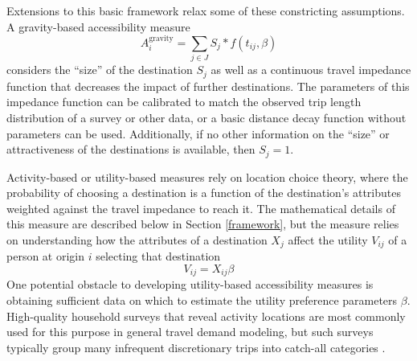 \documentclass[3p, authoryear, review]{elsarticle} %
\begin{document}
Extensions to this basic framework relax some of these constricting assumptions.
A gravity-based accessibility measure
\begin{equation}
  A_i^{\mathrm{gravity}} = \sum_{j \in J} S_j * f(t_{ij}, \beta)
  \label{eq:gravity}
\end{equation}
considers the ``size'' of the destination \(S_j\) as well as a continuous travel
impedance function that decreases the impact of further destinations. The parameters
of this impedance function can be calibrated to match the observed trip length
distribution of a survey or other data, or a basic distance decay function without
parameters can be used. Additionally, if no other information on the ``size'' or
attractiveness of the destinations is available, then \(S_j = 1\).

Activity-based or utility-based measures rely on location choice theory, where
the probability of choosing a destination is a function of the destination's
attributes weighted against the travel impedance to reach it. The mathematical
details of this measure are described below in Section \ref{framework}, but the
measure relies on understanding how the attributes of a destination \(X_j\) affect
the utility \(V_{ij}\) of a person at origin \(i\) selecting that destination
\begin{equation}
V_{ij} = X_{ij}\beta
  \label{eq:simple-utility}
\end{equation}
One potential obstacle to developing utility-based accessibility measures is
obtaining sufficient data on which to estimate the utility preference parameters \(\beta\).
High-quality household surveys that reveal activity locations are most commonly
used for this purpose in general travel demand modeling, but such surveys typically
group many infrequent discretionary trips into catch-all categories \citep{nchrp716}.
\end{document}
